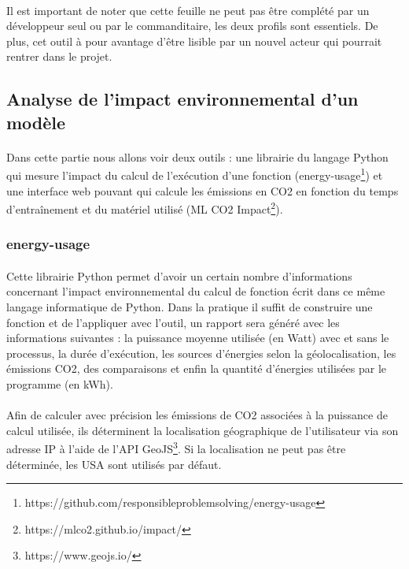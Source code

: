 \documentclass[10pt, french, a4paper]{report}
\begin{document}
\paragraph{}
Il est important de noter que cette feuille ne peut pas être complété par un développeur seul ou par le commanditaire, les deux profils sont essentiels. De plus, cet outil à pour avantage d'être lisible par un nouvel acteur qui pourrait rentrer dans le projet.

\subsection{Analyse de l'impact environnemental d'un modèle}

\paragraph{}
Dans cette partie nous allons voir deux outils : une librairie du langage Python qui mesure l'impact du calcul de l'exécution d'une fonction (energy-usage\footnote{https://github.com/responsibleproblemsolving/energy-usage}) et une interface web pouvant qui calcule les émissions en CO2 en fonction du temps d'entraînement et du matériel utilisé (ML CO2 Impact\footnote{https://mlco2.github.io/impact/}).

\subsubsection{energy-usage}

\paragraph{}
Cette librairie Python permet d'avoir un certain nombre d'informations concernant l'impact environnemental du calcul de fonction écrit dans ce même langage informatique de Python. Dans la pratique il suffit de construire une fonction et de l'appliquer avec l'outil, un rapport sera généré avec les informations suivantes : la puissance moyenne utilisée (en Watt) avec et sans le processus, la durée d'exécution, les sources d'énergies selon la géolocalisation, les émissions CO2, des comparaisons et enfin la quantité d'énergies utilisées par le programme (en kWh).

\paragraph{}
Afin de calculer avec précision les émissions de CO2 associées à la puissance de calcul utilisée, ils déterminent la localisation géographique de l'utilisateur via son adresse IP à l'aide de l'API GeoJS\footnote{https://www.geojs.io/}. Si la localisation ne peut pas être déterminée, les USA sont utilisés par défaut.
\end{document}
